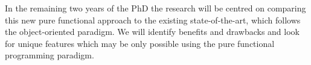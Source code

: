 \documentclass[oneside]{book}
\begin{document}
In the remaining two years of the PhD the research will be centred on comparing this new pure functional approach to the existing state-of-the-art, which follows the object-oriented paradigm. We will identify benefits and drawbacks and look for unique features which may be only possible using the pure functional programming paradigm.

\clearpage
\tableofcontents
\clearpage













\renewcommand\bibname{References}





\end{document}
